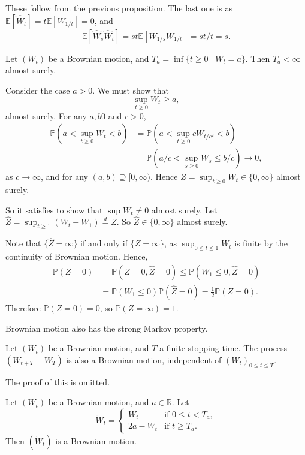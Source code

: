 \documentclass[12pt]{article}
\begin{document}
These follow from the previous proposition. The last one is as $\mathbb{E}[\hat W_t] = t \mathbb{E}[W_{1/t}] = 0$, and
\[
\mathbb{E}[\hat W_s \hat W_t] = st \mathbb{E}[W_{1/s} W_{1/t}] = st/t = s.
\]


\begin{theorem}
	Let $(W_t)$ be a Brownian motion, and $T_a = \inf\{t \geq 0 \mid W_t = a\}$. Then $T_a < \infty$ almost surely.
\end{theorem}

\begin{proofbox}
	Consider the case $a > 0$. We must show that
	\[
	\sup_{t \geq 0} W_t \geq a,
	\]
	almost surely. For any $a, b  0$ and $c > 0$,
	\begin{align*}
		\mathbb{P}(a < \sup_{t \geq 0} W_t < b) &= \mathbb{P}(a < \sup_{t \geq 0} c W_{t/c^2} < b ) \\
							&= \mathbb{P}(a/c < \sup_{s \geq 0} W_{s} \leq b/c) \to 0,
	\end{align*}
	as $c \to  \infty$, and for any $(a, b) \supseteq [0, \infty)$. Hence $Z = \sup_{t \geq 0} W_t \in \{0, \infty\}$ almost surely.

	So it satisfies to show that $\sup W_t \neq 0$ almost surely. Let $\hat Z = \sup_{t \geq 1}(W_t - W_1) \overset{d}{=} Z$. So $\hat Z \in \{0, \infty\}$ almost surely.

	Note that $\{\hat Z = \infty\}$ if and only if $\{Z = \infty\}$, as $\sup_{0 \leq t \leq 1} W_t$ is finite by the continuity of Brownian motion. Hence,
	\begin{align*}
		\mathbb{P}(Z = 0) &= \mathbb{P}(Z = 0, \hat Z = 0) \leq \mathbb{P}(W_1 \leq 0, \hat Z = 0) \\
				  &= \mathbb{P}(W_1 \leq 0) \mathbb{P}(\hat Z = 0) = \frac{1}{2} \mathbb{P}(Z = 0).
	\end{align*}
	Therefore $\mathbb{P}(Z = 0) = 0$, so $\mathbb{P}(Z = \infty) = 1$.
\end{proofbox}

Brownian motion also has the strong Markov property.

\begin{theorem}
	Let $(W_t)$ be a Brownian motion, and $T$ a finite stopping time. The process $(W_{t + T} - W_T)$ is also a Brownian motion, independent of $(W_t)_{0 \leq t \leq T}$.
\end{theorem}

The proof of this is omitted.

\begin{theorem}
	Let $(W_t)$ be a Brownian motion, and $a \in \mathbb{R}$. Let
	\[
	\tilde W_t =
	\begin{cases}
		W_t & \text{if } 0 \leq t < T_a,\\
		2a - W_t & \text{if } t \geq T_a.
	\end{cases}
	\]
	Then $(\tilde W_t)$ is a Brownian motion.
\end{theorem}
\end{document}
